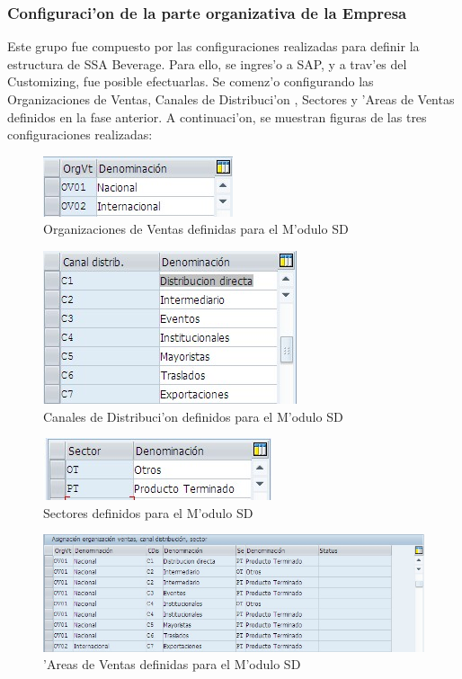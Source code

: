 \subsubsection{Configuraci'on de la parte organizativa de la Empresa}
	Este grupo fue compuesto por las configuraciones realizadas para definir la estructura de SSA Beverage. Para ello, se ingres'o a SAP, y a trav'es del Customizing, fue posible efectuarlas. Se comenz'o configurando las Organizaciones de Ventas, Canales de Distribuci'on , Sectores y 'Areas de Ventas definidos en la fase anterior. A continuaci'on, se muestran figuras de las tres configuraciones realizadas:
\begin{figure}[htb]
\centering
\includegraphics[scale=0.65,type=jpg,ext=.jpg,read=.jpg]{figures/OrgVentas}
\caption{Organizaciones de Ventas definidas para el M'odulo SD}
\label{fig:orgventas}
\end{figure}
\begin{figure}[htb]
\centering
\includegraphics[scale=0.65,type=jpg,ext=.jpg,read=.jpg]{figures/CanalesDistribucion}
\caption{Canales de Distribuci'on definidos para el M'odulo SD}
\label{fig:canales}
\end{figure}
\begin{figure}[htb]
\centering
\includegraphics[scale=0.65,type=jpg,ext=.jpg,read=.jpg]{figures/Sectores}
\caption{Sectores definidos para el M'odulo SD}
\label{fig:sectores}
\end{figure}
\begin{figure}[htb]
\centering
\includegraphics[scale=0.65,type=jpg,ext=.jpg,read=.jpg]{figures/AreaVentas}
\caption{'Areas de Ventas definidas para el M'odulo SD}
\label{fig:areas}
\end{figure}
